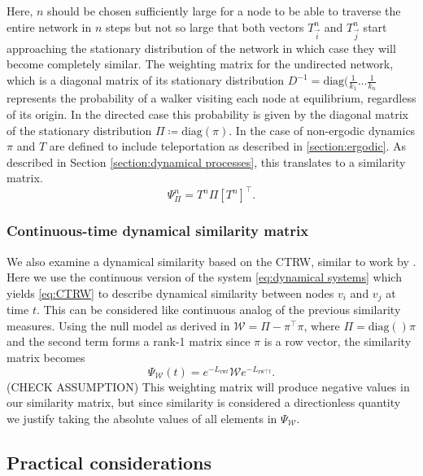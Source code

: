 \documentclass[12pt,a4paper]{article}
\begin{document}
\noindent Here, $n$ should be chosen sufficiently large for a node to be able to traverse the entire network in $n$ steps but not so large that both vectors $T_{\vec{i}}^n$ and $T_{\vec{j}}^n$ start approaching the stationary distribution of the network \cite{lambiottenotes} in which case they will become completely similar. The weighting matrix for the undirected network, which is a diagonal matrix of its stationary distribution $D^{-1} = \text{diag}(\frac{1}{k_1} \dots \frac{1}{k_n}$ represents the probability of a walker visiting each node at equilibrium, regardless of its origin. In the directed case this probability is given by the diagonal matrix of the stationary distribution $\Pi \coloneqq \text{diag}(\pi)$. In the case of non-ergodic dynamics $\pi$  and $T$ are defined to include teleportation as described in \ref{section:ergodic}. As described in Section \ref{section:dynamical processes}, this translates to a similarity matrix.
\begin{equation}
    \Psi_{\Pi}^n = T^n \Pi [T^n]^\top .
\end{equation}

\subsubsection{Continuous-time dynamical similarity matrix} \label{sec:CTRW similarity matrix}
We also examine a dynamical similarity based on the CTRW, similar to work by \cite{schaub2019multiscale}. Here we use the continuous version of the system \ref{eq:dynamical systems} which yields \ref{eq:CTRW} to describe dynamical similarity between nodes $v_i$ and $v_j$ at time $t$. This can be considered like continuous analog of the previous similarity measures. Using the null model as derived in \cite{schaub2019multiscale} $\mathcal W = \Pi - \pi^\top \pi$, where $\Pi = \text{diag}()\pi$ and the second term forms a rank-1 matrix since $\pi$ is a row vector, the similarity matrix becomes
\begin{equation}
  \Psi_{\mathcal W}(t) = e^{-L_{\text{rw}t}}\mathcal{W}e^{-L_{\text{rw}\top t}}.
\end{equation} (CHECK ASSUMPTION) This weighting matrix will produce negative values in our similarity matrix, but since similarity is considered a directionless quantity we justify taking the absolute values of all elements in $\Psi_{\mathcal W}$.

\subsection{Practical considerations}
\end{document}
